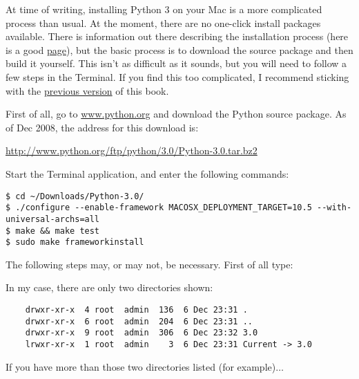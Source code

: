\begin{MAC}

\noindent
At time of writing, installing Python 3 on your Mac is a more complicated process than usual.  At the moment, there are no one-click install packages available.  There is information out there describing the installation process (here is a good \href{http://farmdev.com/thoughts/66/python-3-0-on-mac-os-x-alongside-2-6-2-5-etc-/}{page}), but the basic process is to download the source package and then build it yourself.  This isn't as difficult as it sounds, but you will need to follow a few steps in the Terminal.  If you find this too complicated, I recommend sticking with the \href{http://www.briggs.net.nz/log/wp-content/uploads/2008/03/swfk-mac.zip}{previous version} of this book.

\noindent
First of all, go to \href{www.python.org}{www.python.org} and download the Python source package. As of Dec 2008, the address for this download is:

\noindent
\href{http://www.python.org/ftp/python/3.0/Python-3.0.tar.bz2}{http://www.python.org/ftp/python/3.0/Python-3.0.tar.bz2}

\noindent
Start the Terminal application, and enter the following commands:

\begin{listing}
\begin{verbatim}
$ cd ~/Downloads/Python-3.0/
$ ./configure --enable-framework MACOSX_DEPLOYMENT_TARGET=10.5 --with-universal-archs=all
$ make && make test
$ sudo make frameworkinstall
\end{verbatim}
\end{listing}

\noindent
The following steps may, or may not, be necessary.  First of all type: 


\noindent
In my case, there are only two directories shown:

\begin{listing}
\begin{verbatim}
    drwxr-xr-x  4 root  admin  136  6 Dec 23:31 .
    drwxr-xr-x  6 root  admin  204  6 Dec 23:31 ..
    drwxr-xr-x  9 root  admin  306  6 Dec 23:32 3.0
    lrwxr-xr-x  1 root  admin    3  6 Dec 23:31 Current -> 3.0
\end{verbatim}
\end{listing}

\noindent
If you have more than those two directories listed (for example)$\ldots$


\end{MAC}
